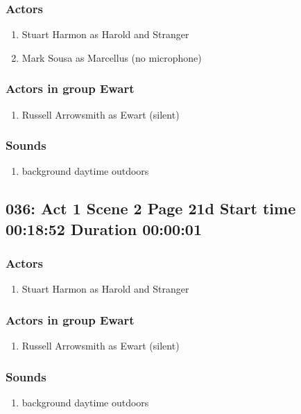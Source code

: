 \subsubsection{Actors}
\begin{enumerate}
\item Stuart Harmon as Harold and Stranger
\item Mark Sousa as Marcellus (no microphone)
\end{enumerate}
\subsubsection{Actors in group Ewart}
\begin{enumerate}
\item Russell Arrowsmith as Ewart (silent)
\end{enumerate}

\subsubsection{Sounds}
\begin{enumerate}
\item background daytime outdoors
\end{enumerate}
\subsection{036: Act 1 Scene 2 Page 21d Start time 00:18:52 Duration 00:00:01}

\subsubsection{Actors}
\begin{enumerate}
\item Stuart Harmon as Harold and Stranger
\end{enumerate}
\subsubsection{Actors in group Ewart}
\begin{enumerate}
\item Russell Arrowsmith as Ewart (silent)
\end{enumerate}

\subsubsection{Sounds}
\begin{enumerate}
\item background daytime outdoors
\end{enumerate}
